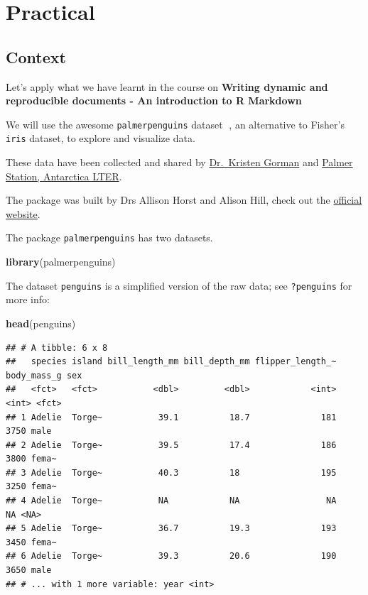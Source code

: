 \documentclass[
  12pt,
]{book}
\newenvironment{Shaded}{\begin{snugshade}}{\end{snugshade}}
\newcommand{\KeywordTok}[1]{\textcolor[rgb]{0.13,0.29,0.53}{\textbf{#1}}}
\newcommand{\NormalTok}[1]{#1}
\begin{document}
\hypertarget{practical}{%
\section{Practical}\label{practical}}

\hypertarget{context}{%
\subsection{Context}\label{context}}

Let's apply what we have learnt in the course on \textbf{Writing dynamic and reproducible documents - An introduction to R Markdown}

We will use the awesome \texttt{palmerpenguins} dataset 🐧, an alternative to Fisher's \texttt{iris} dataset, to explore and visualize data.

These data have been collected and shared by \href{https://www.uaf.edu/cfos/people/faculty/detail/kristen-gorman.php}{Dr.~Kristen Gorman} and \href{https://pal.lternet.edu/}{Palmer Station, Antarctica LTER}.

The package was built by Drs Allison Horst and Alison Hill, check out the \href{https://allisonhorst.github.io/palmerpenguins/}{official website}.

The package \texttt{palmerpenguins} has two datasets.

\begin{Shaded}
\begin{Highlighting}[]
\KeywordTok{library}\NormalTok{(palmerpenguins)}
\end{Highlighting}
\end{Shaded}

The dataset \texttt{penguins} is a simplified version of the raw data; see \texttt{?penguins} for more info:

\begin{Shaded}
\begin{Highlighting}[]
\KeywordTok{head}\NormalTok{(penguins)}
\end{Highlighting}
\end{Shaded}

\begin{verbatim}
## # A tibble: 6 x 8
##   species island bill_length_mm bill_depth_mm flipper_length_~ body_mass_g sex  
##   <fct>   <fct>           <dbl>         <dbl>            <int>       <int> <fct>
## 1 Adelie  Torge~           39.1          18.7              181        3750 male 
## 2 Adelie  Torge~           39.5          17.4              186        3800 fema~
## 3 Adelie  Torge~           40.3          18                195        3250 fema~
## 4 Adelie  Torge~           NA            NA                 NA          NA <NA> 
## 5 Adelie  Torge~           36.7          19.3              193        3450 fema~
## 6 Adelie  Torge~           39.3          20.6              190        3650 male 
## # ... with 1 more variable: year <int>
\end{verbatim}
\end{document}
